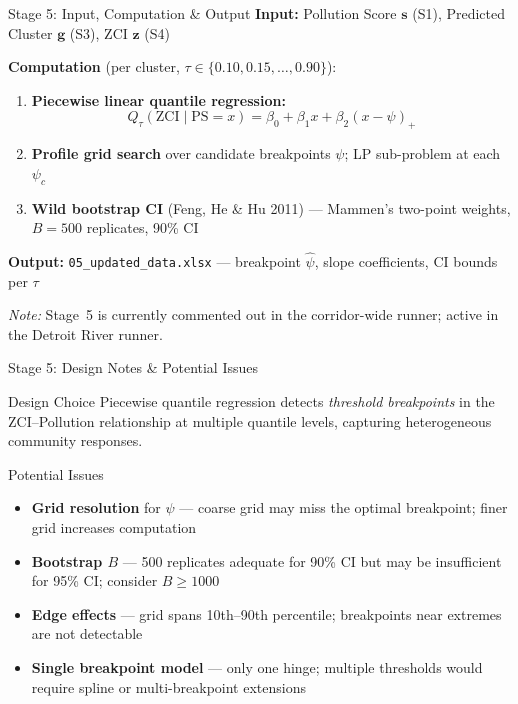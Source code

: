 \documentclass[aspectratio=169, 11pt]{beamer}
\newcommand{\code}[1]{\texttt{\small #1}}
\newcommand{\PS}{\mathrm{PS}}
\newcommand{\ZCI}{\mathrm{ZCI}}
\begin{document}
\begin{frame}{Stage 5: Input, Computation \& Output}
  \textbf{Input:} Pollution Score $\mathbf{s}$ (S1),
  Predicted Cluster $\mathbf{g}$ (S3), ZCI $\mathbf{z}$ (S4)

  \vspace{0.3em}
  \textbf{Computation} (per cluster, $\tau \in \{0.10, 0.15, \dots, 0.90\}$):
  \begin{enumerate}\small
    \item \textbf{Piecewise linear quantile regression:}
          \[
            Q_\tau(\ZCI \mid \PS{=}x)
            = \beta_0 + \beta_1 x + \beta_2 (x - \psi)_+
          \]
    \item \textbf{Profile grid search} over candidate breakpoints $\psi$;
          LP sub-problem at each $\psi_c$
    \item \textbf{Wild bootstrap CI} (Feng, He \& Hu 2011) ---
          Mammen's two-point weights, $B{=}500$ replicates, 90\% CI
  \end{enumerate}

  \vspace{0.3em}
  \textbf{Output:} \code{05\_updated\_data.xlsx} ---
  breakpoint $\hat\psi$, slope coefficients, CI bounds per $\tau$

  \vspace{0.2em}
  {\small\emph{Note:} Stage~5 is currently commented out in the corridor-wide runner;
  active in the Detroit River runner.}
\end{frame}

\begin{frame}{Stage 5: Design Notes \& Potential Issues}
  \begin{block}{Design Choice}
    Piecewise quantile regression detects \emph{threshold breakpoints}
    in the ZCI--Pollution relationship at multiple quantile levels,
    capturing heterogeneous community responses.
  \end{block}

  \vspace{0.4em}
  \begin{alertblock}{Potential Issues}
    \begin{itemize}\small
      \item \textbf{Grid resolution} for $\psi$ --- coarse grid may miss
            the optimal breakpoint; finer grid increases computation
      \item \textbf{Bootstrap $B$} --- 500 replicates adequate for 90\% CI
            but may be insufficient for 95\% CI; consider $B \ge 1000$
      \item \textbf{Edge effects} --- grid spans 10th--90th percentile;
            breakpoints near extremes are not detectable
      \item \textbf{Single breakpoint model} --- only one hinge; multiple
            thresholds would require spline or multi-breakpoint extensions
    \end{itemize}
  \end{alertblock}
\end{frame}
\end{document}
